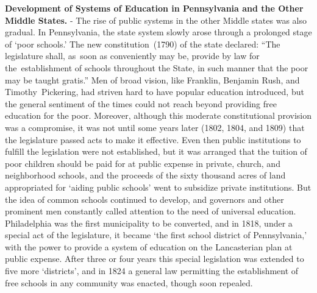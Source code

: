 \documentclass[
]{book}
\begin{document}
\textbf{Development of Systems of Education in Pennsylvania and the Other Middle States.} - The rise of public systems in the other Middle states was also gradual. In Pennsylvania, the state system slowly arose through a prolonged stage of `poor schools.' The new constitution~(1790) of the state declared: ``The legislature shall, as~soon as conveniently may be, provide by law for the~establishment of schools throughout the State, in such manner that the poor may be taught gratis.'' Men of broad vision, like Franklin, Benjamin Rush, and Timothy~Pickering, had striven hard to have popular education introduced, but the general sentiment of the times could not reach beyond providing free education for the poor. Moreover, although this moderate constitutional provision was a compromise, it was not until some years later (1802, 1804, and 1809) that the legislature passed acts to make it effective. Even then public institutions to fulfill the legislation were not established, but it was arranged that the tuition of poor children should be paid for at public expense in private, church, and neighborhood schools, and the proceeds of the sixty thousand acres of land appropriated for `aiding public schools' went to subsidize private institutions. But the idea of common schools continued to develop, and governors and other prominent men constantly called attention to the need of universal education. Philadelphia was the first municipality to be converted, and in 1818, under a special act of the legislature, it became `the first school district of Pennsylvania,' with the power to provide a system of education on the Lancasterian plan at public expense. After three or four years this special legislation was extended to five more `districts', and in 1824 a general law permitting the establishment of free schools in any community was enacted, though soon repealed.
\end{document}
